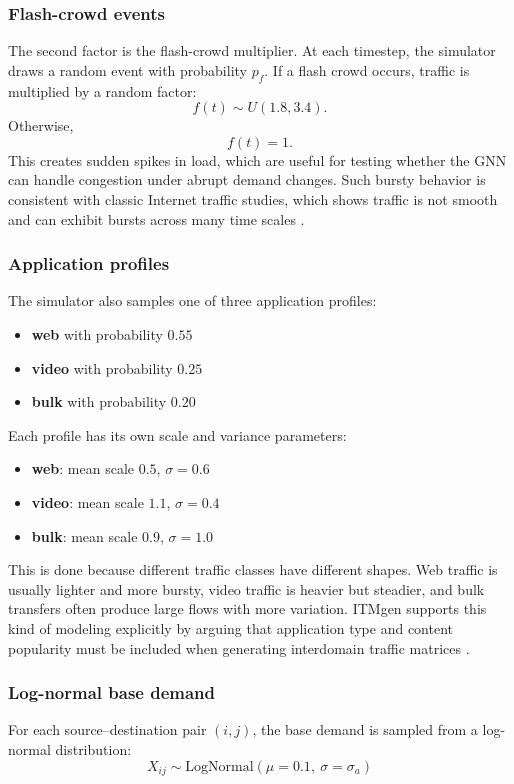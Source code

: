 \documentclass[12pt]{article}
\begin{document}
\subsubsection{Flash-crowd events}
The second factor is the flash-crowd multiplier. At each timestep, the simulator draws a random event with probability $p_f$. If a flash crowd occurs, traffic is multiplied by a random factor:
\[
f(t) \sim U(1.8, 3.4).
\]
Otherwise,
\[
f(t) = 1.
\]
This creates sudden spikes in load, which are useful for testing whether the GNN can handle congestion under abrupt demand changes. Such bursty behavior is consistent with classic Internet traffic studies, which shows traffic is not smooth and can exhibit bursts across many time scales \cite{ethernetTraffic}.

\subsubsection{Application profiles}
The simulator also samples one of three application profiles:
\begin{itemize}
    \item \textbf{web} with probability $0.55$
    \item \textbf{video} with probability $0.25$
    \item \textbf{bulk} with probability $0.20$
\end{itemize}

Each profile has its own scale and variance parameters:
\begin{itemize}
    \item \textbf{web}: mean scale $0.5$, $\sigma = 0.6$
    \item \textbf{video}: mean scale $1.1$, $\sigma = 0.4$
    \item \textbf{bulk}: mean scale $0.9$, $\sigma = 1.0$
\end{itemize}

This is done because different traffic classes have different shapes. Web traffic is usually lighter and more bursty, video traffic is heavier but steadier, and bulk transfers often produce large flows with more variation. ITMgen supports this kind of modeling explicitly by arguing that application type and content popularity must be included when generating interdomain traffic matrices \cite{itmgen}.

\subsubsection{Log-normal base demand}
For each source--destination pair $(i,j)$, the base demand is sampled from a log-normal distribution:
\[
X_{ij} \sim \text{LogNormal}(\mu = 0.1,\ \sigma = \sigma_a)
\]
\end{document}
